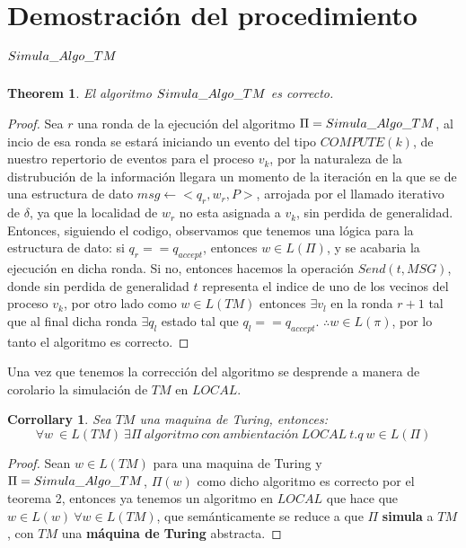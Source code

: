 \documentclass[10pt]{report}
\newtheorem{corrollary}{Corrollary}
\newtheorem{theorem}{Theorem}
\begin{document}
    \section{Demostración del procedimiento $Simula\char95Algo\char95TM$}\label{sec:demostración-del-procedimiento}
    \begin{theorem}
        El algoritmo $Simula\char95Algo\char95TM$ es correcto.
    \end{theorem}
    \begin{proof}
        Sea $r$ una ronda de la ejecución del algoritmo $\Pi=Simula\char95Algo\char95TM$,
        al incio de esa ronda se estará iniciando un evento del tipo $COMPUTE(k)$, de nuestro repertorio de eventos para el proceso
        $v_{k}$, por la naturaleza de la distrubución de la información llegara un momento
        de la iteración en la que  se de una estructura de dato $msg\gets <q_{r},w_{r},P>$, arrojada por el llamado iterativo de
        $\delta$, ya que la localidad de $w_{r}$ no esta asignada a $v_{k}$, sin perdida de generalidad.
        Entonces, siguiendo el codigo, observamos que tenemos una lógica para la estructura de dato:
        si $q_{r}==q_{accept}$, entonces $w\in L(\Pi)$, y se acabaria la ejecución en dicha ronda.
        Si no, entonces hacemos la operación $Send(t,MSG)$, donde sin perdida de generalidad $t$ representa el indice de uno de los vecinos
        del proceso $v_{k}$, por otro lado como $w\in L(TM)$ entonces $\exists v_{l}$ en la ronda $r+1$
        tal que al final dicha ronda $\exists q_{l}$ estado tal que $q_{l} == q_{accept}$.\newline
        $\therefore w\in L(\pi)$, por lo tanto el algoritmo es correcto.

    \end{proof}
    Una vez que tenemos la corrección del algoritmo se desprende a manera de corolario la
    simulación de $TM$ en $LOCAL$.
    \begin{corrollary}
        Sea $TM$ una maquina de Turing, entonces:
        \begin{equation}
            \forall w \  \in L(TM) \ \exists \Pi \ algoritmo \ con\ ambientación \ LOCAL\ t.q \ w \in L(\Pi)
        \end{equation}
    \end{corrollary}

    \begin{proof}
        Sean $w\in L(TM)$ para una maquina de Turing y  $\Pi =Simula\char95Algo\char95TM$, $\Pi(w)$ como dicho algoritmo es correcto por el teorema 2,
        entonces ya tenemos un algoritmo  en $LOCAL$ que hace  que $w\in L(w) \ \forall w\in L(TM)$,
        que semánticamente se reduce a que $\Pi$ \textbf{simula} a $TM$, con $TM$ una \textbf{máquina de Turing} abstracta.
    \end{proof}
\end{document}
